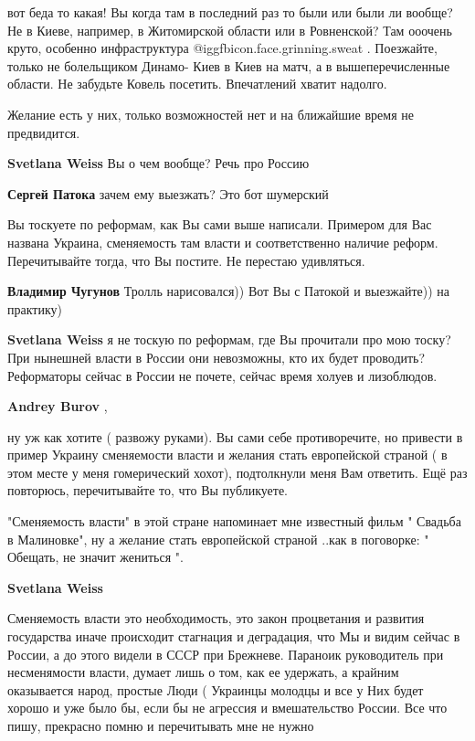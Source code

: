 \begin{itemize}
\begin{itemize}
вот беда то какая! Вы когда там в последний раз то были или были ли вообще? Не
в Киеве, например, в Житомирской области или в Ровненской? Там ооочень круто,
особенно инфраструктура  @igg{fbicon.face.grinning.sweat} . Поезжайте, только не болельщиком Динамо- Киев в
Киев на матч, а в вышеперечисленные области. Не забудьте Ковель посетить.
Впечатлений хватит надолго.

Желание есть у них, только возможностей нет и на ближайшие время не
предвидится.

\textbf{Svetlana Weiss} Вы о чем вообще? Речь про Россию

\textbf{Сергей Патока} зачем ему выезжать? Это бот шумерский


Вы тоскуете по реформам, как Вы сами выше написали. Примером для Вас названа
Украина, сменяемость там власти и соответственно наличие реформ. Перечитывайте
тогда, что Вы постите. Не перестаю удивляться.


\textbf{Владимир Чугунов} Тролль нарисовался)) Вот Вы с Патокой и выезжайте)) на практику)

\textbf{Svetlana Weiss} я не тоскую по реформам, где Вы прочитали про мою тоску? При нынешней власти в России они невозможны, кто их будет проводить? Реформаторы сейчас в России не почете, сейчас время холуев и лизоблюдов.

\textbf{Andrey Burov} , 

ну уж как хотите ( развожу руками). Вы сами себе противоречите, но привести в
пример Украину сменяемости власти и желания стать европейской страной ( в этом
месте у меня гомерический хохот), подтолкнули меня Вам ответить. Ещё раз
повторюсь, перечитывайте то, что Вы публикуете.

"Сменяемость власти" в этой стране напоминает мне известный фильм " Свадьба в
Малиновке", ну а желание стать европейской страной ..как в поговорке: "
Обещать, не значит жениться ".

\textbf{Svetlana Weiss} 

Сменяемость власти это необходимость, это закон процветания и развития
государства иначе происходит стагнация и деградация, что Мы и видим сейчас в
России, а до этого видели в СССР при Брежневе. Параноик руководитель при
несменямости власти, думает лишь о том, как ее удержать, а крайним оказывается
народ, простые Люди ( Украинцы молодцы и все у Них будет хорошо и уже было бы,
если бы не агрессия и вмешательство России. Все что пишу, прекрасно помню и
перечитывать мне не нужно


\end{itemize}
\end{itemize}
